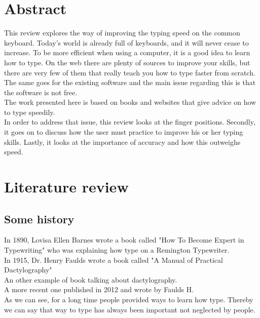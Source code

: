 \chapter{Abstract}
This review explores the way of improving the typing speed on the common keyboard.
Today's world is already full of keyboards, and it will never cease to increase. To be more efficient when using a computer, it is a good idea to learn how to type. On the web there are plenty of sources to improve your skills, but there are very few of them that really teach you how to type faster from scratch. The same goes for the existing software and the main issue regarding this is that the software is not free.\\
The work presented here is based on books and websites that give advice on how to type speedily.\\
In order to address that issue, this review looks at the finger positions. Secondly, it goes on to discuss how the user must practice to improve his or her typing skills. Lastly, it looks at the importance of accuracy and how this outweighs speed.

\clearpage
\chapter{Literature review}
\section{Some history}
In 1890, Lovisa Ellen Barnes wrote a book called "How To Become Expert in Typewriting"\cite{ref2} who was explaining how type on a Remington Typewriter.\\
In 1915, Dr. Henry Faulds wrote a book called "A Manual of Practical Dactylography"\cite{ref3}\\
An other example of book talking about dactylography.\cite{ref5}\\   
A more recent one published in 2012 and wrote by Faulds H.\cite{ref4}\\
As we can see, for a long time people provided ways to learn how type. Thereby we can say that way to type has always been important not neglected by people.\\

